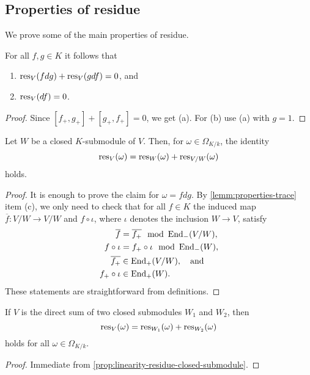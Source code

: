 \subsection{Properties of residue}
We prove some of the main properties of residue.
\begin{proposition}\label{prop:linearity-residue}
	For all $f,g \in K$ it follows that
	\begin{enumerate}[label = (\alph*)]
		\item $\operatorname{res}_{V}(fdg) + \operatorname{res}_{V}(gdf) = 0$, and
		\item $\operatorname{res}_V(df) = 0$.
	\end{enumerate}
\end{proposition}
\begin{proof}
	Since $[f_{+}, g_{+}] + [g_{+}, f_{+}] = 0$, we get (a). For (b) use (a) with $g = 1$. 
\end{proof}
\begin{proposition}\label{prop:linearity-residue-closed-submodule}
	Let $W$ be a closed $K$-submodule of $V$. Then, for $\omega \in \Omega_{K/k}$, the identity
	\[
		\operatorname{res}_{V}(\omega) = \operatorname{res}_{W}(\omega) + \operatorname{res}_{V/W}(\omega)
	\]
	holds.
\end{proposition}
\begin{proof}
	It is enough to prove the claim for $\omega = f dg$. By \cref{lemm:properties-trace} item (c), we only need to check that for all $f \in K$ the induced map $\overline{f}\colon V/W \to V/W$ and $f \circ \iota$, where $\iota$ denotes the inclusion $W \to V$, satisfy
	\begin{align*}
	\overline{f} &= \overline{f_{+}} \mod {\operatorname{End}}_{-}(V/W), \\
	f \circ \iota &= f_{+} \circ \iota \mod {\operatorname{End}}_{-}(W), \\ 
	\overline{f_{+}}&\in \operatorname{End}_{+}(V/W), \quad\text{and} \\
	f_{+} \circ \iota &\in \operatorname{End}_{+}(W).
	\end{align*}
	These statements are straightforward from definitions.
\end{proof}
\begin{proposition}\label{prop:direct-sum-residue}
	If $V$ is the direct sum of two closed submodules $W_{1}$ and $W_{2}$, then 
	\[
		\operatorname{res}_{V}(\omega) = \operatorname{res}_{W_{1}}(\omega) + \operatorname{res}_{W_{2}}(\omega)
	\]
	holds for all $\omega \in \Omega_{K/k}$.
\end{proposition}
\begin{proof}
	Immediate from \cref{prop:linearity-residue-closed-submodule}.
\end{proof}
